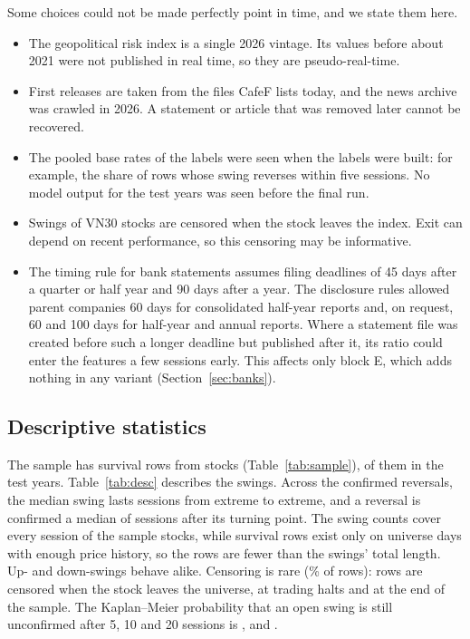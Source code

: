 Some choices could not be made perfectly point in time, and we state them here.
\begin{itemize}
\item The geopolitical risk index is a single 2026 vintage. Its values before about 2021 were not
  published in real time, so they are pseudo-real-time.
\item First releases are taken from the files CafeF lists today, and the news archive was crawled
  in 2026. A statement or article that was removed later cannot be recovered.
\item The pooled base rates of the labels were seen when the labels were built: for example, the
  share of rows whose swing reverses within five sessions. No model output for the test years was
  seen before the final run.
\item Swings of VN30 stocks are censored when the stock leaves the index. Exit can depend on recent
  performance, so this censoring may be informative.
\item The timing rule for bank statements assumes filing deadlines of 45 days after a quarter or half
  year and 90 days after a year. The disclosure rules allowed parent companies 60 days for
  consolidated half-year reports and, on request, 60 and 100 days for half-year and annual reports.
  Where a statement file was created before such a longer deadline but published after it, its ratio
  could enter the features a few sessions early. This affects only block E, which adds nothing in
  any variant (Section~\ref{sec:banks}).
\end{itemize}

\subsection{Descriptive statistics}\label{sec:desc}

The sample has \SurvivalRows{} survival rows from \StockCount{} stocks
(Table~\ref{tab:sample}), \TestRows{} of them in the test years. Table~\ref{tab:desc} describes the
swings. Across the \SwingsConfirmed{} confirmed reversals, the median swing lasts
\SwingLengthMedian{} sessions from extreme to extreme, and a reversal is confirmed a median of
\ConfirmLagMedian{} sessions after its turning point. The swing counts cover every session of the
sample stocks, while survival rows exist only on universe days with enough price history, so the
rows are fewer than the swings' total length. Up- and down-swings behave alike. Censoring is
rare (\CensoredPct\% of rows): \CensoredUniverseExit{} rows are censored when the stock leaves the
universe, \CensoredHalt{} at trading halts and \CensoredEndOfSample{} at the end of the sample. The
Kaplan--Meier probability that an open swing is still unconfirmed after 5, 10 and 20 sessions is
\KMSurvFive, \KMSurvTen{} and \KMSurvTwenty.

